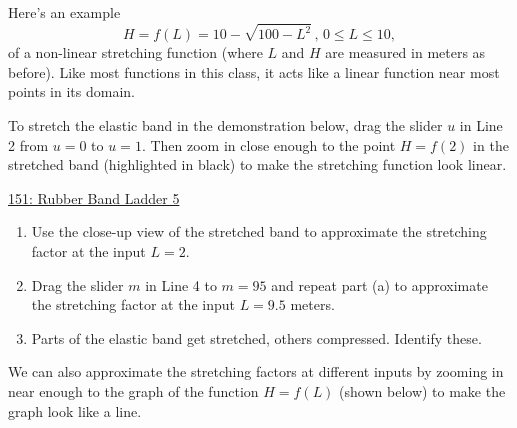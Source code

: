 \documentclass{ximera}
\begin{document}
\begin{example} \label{Ex:JDJFHDtet434t}
Here's an example
\[
      H = f(L) = 10 - \sqrt{100-L^2} \, , \, 0\leq L \leq 10,
\] 
of a non-linear stretching function (where $L$ and $H$ are measured in meters as before). Like most functions in this class, it acts like a linear function near most points in its domain. 

To stretch the elastic band in the demonstration below, drag the slider $u$ in Line 2 from $u=0$ to $u=1$. Then zoom in close enough to the point $H=f(2)$ in the stretched band (highlighted in black) to make the stretching function look linear. %


\begin{onlineOnly}
    \begin{center}
\end{center}
\end{onlineOnly}

\href{https://www.desmos.com/calculator/nyd60dbezj}{151: Rubber Band Ladder 5}


\begin{enumerate}

\item Use the close-up view of the stretched band to approximate the stretching factor at the input $L=2$.

\item Drag the slider $m$ in Line 4 to $m=95$ and repeat part (a) to approximate the stretching factor at the input $L=9.5$ meters.

\item Parts of the elastic band get stretched, others compressed. Identify these.
\end{enumerate}

We can also approximate the stretching factors at different inputs by zooming in near enough to the graph of the function $H=f(L)$ (shown below) to make the graph look like a line. %

\begin{onlineOnly}
    \begin{center}
\end{center}
\end{onlineOnly}


\end{example}
\end{document}
